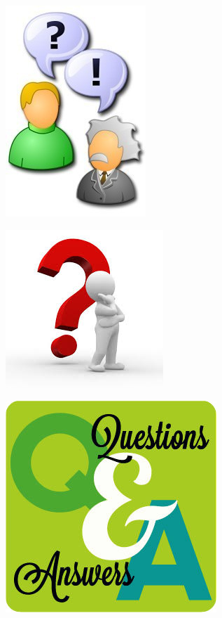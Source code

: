 \documentclass{beamer}
\begin{document}
\begin{frame}
	\begin{figure}
	\includegraphics{QandA/QandA3}
	\end{figure}
\end{frame}

\begin{frame}
	\begin{figure}
	\includegraphics{QandA/QandA4}
	\end{figure}
\end{frame}

\begin{frame}
	\begin{figure}
	\includegraphics{QandA/QandA5}
	\end{figure}
\end{frame}
\end{document}
